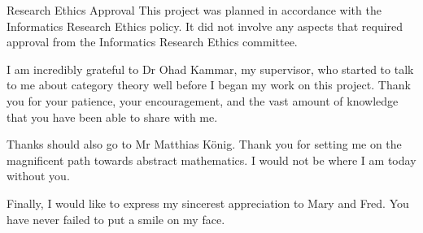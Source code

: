 \documentclass[bsc,singlespacing,parskip,logo]{infthesis}
\begin{document}
\begin{preliminary}
  \maketitle

  \newenvironment{ethics}
  {\begin{frontenv}{Research Ethics Approval}{\LARGE}}
  {\end{frontenv}\newpage}

  \begin{ethics}
    This project was planned in accordance with the Informatics Research
    Ethics policy. It did not involve any aspects that required approval
    from the Informatics Research Ethics committee.

    \standarddeclaration
  \end{ethics}


  \begin{acknowledgements}
    I am incredibly grateful to Dr Ohad Kammar, my supervisor, who started to
    talk to me about category theory well before I began my work on this
    project. Thank you for your patience, your encouragement, and the vast
    amount of knowledge that you have been able to share with me.

    Thanks should also go to Mr Matthias K\"onig. Thank you for setting me on
    the magnificent path towards abstract mathematics. I would not be where I am
    today without you.

    Finally, I would like to express my sincerest appreciation to Mary
    and Fred. You have never failed to put a smile on my face.
  \end{acknowledgements}


  \tableofcontents
\end{preliminary}















\end{document}
